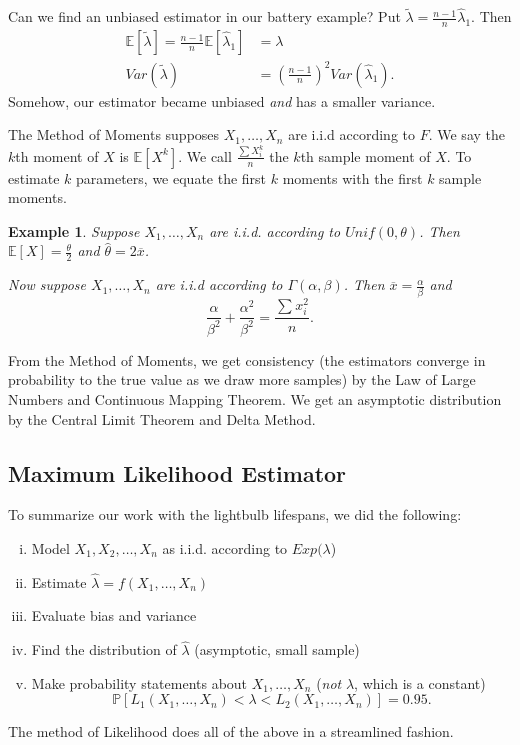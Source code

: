 \documentclass{tufte-handout}
\newcommand*\E{\mathbb{E}}
\renewcommand{\P}{\mathbb{P}}
\newtheorem{ex}[thm]{Example}
\theoremstyle{definition}
\begin{document}
Can we find an unbiased estimator in our battery example? Put $\tilde{\lambda} = \frac{n-1}{n}\hat{\lambda}_1$. Then
\begin{align*}
	\E\left[\tilde{\lambda}\right] = \frac{n-1}{n}\E\left[\hat{\lambda}_1\right] &= \lambda \\
	Var(\tilde{\lambda}) &= \left( \frac{n-1}{n} \right)^2 Var(\hat{\lambda}_1) 
.\end{align*}
Somehow, our estimator became unbiased \emph{and} has a smaller variance.

The Method of Moments  supposes $X_1,\ldots,X_n$ are i.i.d according to $F$. We say the $k$th moment of $X$ is $\E\left[X^k\right]$. We call $
	\frac{\sum\limits X_i^k}{n}$
 the $k$th sample moment of $X$.
To estimate $k$ parameters, we equate the first $k$ moments with the first $k$ sample moments.

\begin{ex}
	Suppose $X_1,\ldots,X_n$ are i.i.d. according to $Unif(0,\theta)$. Then $\E\left[X\right]  = \frac{\theta}{2}$ and $\hat{\theta} = 2\overline{x}$.

	Now suppose $X_1,\ldots,X_n$ are i.i.d according to $\Gamma(\alpha,\beta)$. Then $\overline{x} = \frac{\alpha}{\beta}$ and \[
		\frac{\alpha}{\beta^2} + \frac{\alpha^2}{\beta^2} = \frac{\sum_{} x_i^2}{n}
	.\]
\end{ex}

From the Method of Moments, we get consistency (the estimators converge in probability to the true value as we draw more samples) by the Law of Large Numbers and Continuous Mapping Theorem. We get an asymptotic distribution by the Central Limit Theorem and Delta Method.

\subsection{Maximum Likelihood Estimator}

To summarize our work with the lightbulb lifespans, we did the following:
\begin{enumerate}[(i)]
	\item Model $X_1,X_2,\ldots,X_n$ as i.i.d. according to $Exp(\lambda$)
	\item Estimate $\hat{\lambda} = f(X_1,\ldots,X_n)$
	\item Evaluate bias and variance
	\item Find the distribution of $\hat{\lambda}$ (asymptotic, small sample)
	\item Make probability statements about $X_1,\ldots,X_n$ (\emph{not} $\lambda$, which is a constant)\[
		\P\left[L_1(X_1,\ldots,X_n) < \lambda < L_2(X_1,\ldots,X_n)\right] = 0.95
	.\] 
\end{enumerate}
The method of Likelihood does all of the above in a streamlined fashion.
\end{document}

